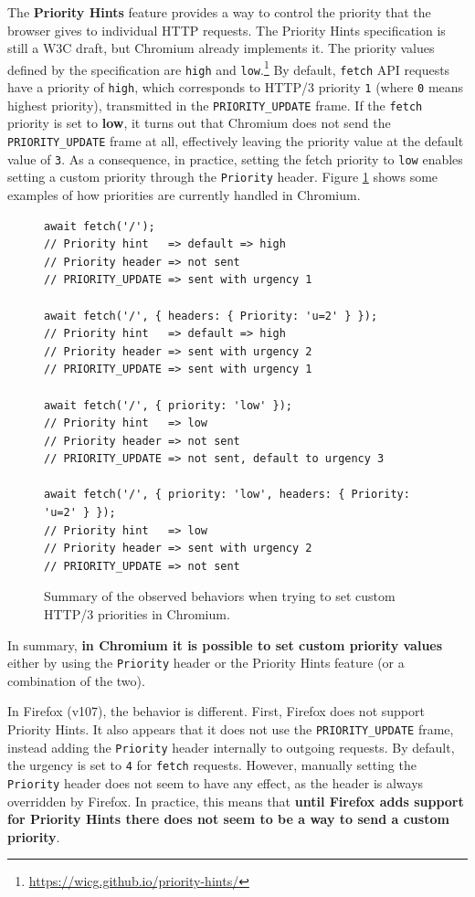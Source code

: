 The \textbf{Priority Hints} feature provides a way to control the priority that the browser gives to individual HTTP requests. The Priority Hints specification is still a W3C draft, but Chromium already implements it. The priority values defined by the specification are \texttt{high} and \texttt{low}.\footnote{\url{https://wicg.github.io/priority-hints/}} By default, \texttt{fetch} API requests have a priority of \texttt{high}, which corresponds to HTTP/3 priority \texttt{1} (where \texttt{0} means highest priority), transmitted in the \texttt{PRIORITY\_UPDATE} frame. If the \texttt{fetch} priority is set to \textbf{low}, it turns out that Chromium does not send the \texttt{PRIORITY\_UPDATE} frame at all, effectively leaving the priority value at the default value of \texttt{3}. As a consequence, in practice, setting the fetch priority to \texttt{low} enables setting a custom priority through the \texttt{Priority} header. Figure \ref{fig:chromium_fetch} shows some examples of how priorities are currently handled in Chromium.

\begin{figure}[h]
    \centering
    \begin{verbatim}
await fetch('/');
// Priority hint   => default => high
// Priority header => not sent
// PRIORITY_UPDATE => sent with urgency 1

await fetch('/', { headers: { Priority: 'u=2' } });
// Priority hint   => default => high
// Priority header => sent with urgency 2
// PRIORITY_UPDATE => sent with urgency 1

await fetch('/', { priority: 'low' });
// Priority hint   => low
// Priority header => not sent
// PRIORITY_UPDATE => not sent, default to urgency 3

await fetch('/', { priority: 'low', headers: { Priority: 'u=2' } });
// Priority hint   => low
// Priority header => sent with urgency 2
// PRIORITY_UPDATE => not sent
    \end{verbatim}
    \caption{Summary of the observed behaviors when trying to set custom HTTP/3 priorities in Chromium.}
    \label{fig:chromium_fetch}
\end{figure}

In summary, \textbf{in Chromium it is possible to set custom priority values} either by using the \texttt{Priority} header or the Priority Hints feature (or a combination of the two).

In Firefox (v107), the behavior is different. First, Firefox does not support Priority Hints. It also appears that it does not use the \texttt{PRIORITY\_UPDATE} frame, instead adding the \texttt{Priority} header internally to outgoing requests. By default, the urgency is set to \texttt{4} for \texttt{fetch} requests. However, manually setting the \texttt{Priority} header does not seem to have any effect, as the header is always overridden by Firefox. In practice, this means that \textbf{until Firefox adds support for Priority Hints there does not seem to be a way to send a custom priority}.

